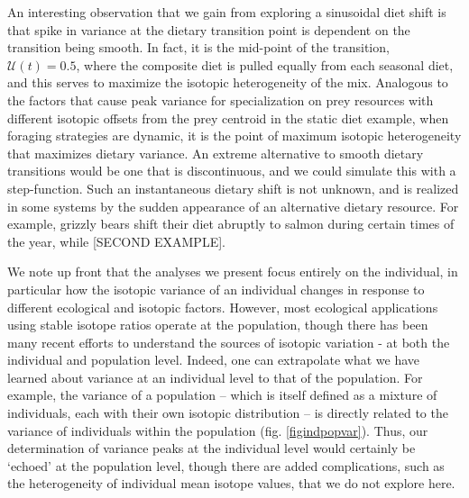 \documentclass{frontiersSCNS}
\begin{document}
An interesting observation that we gain from exploring a sinusoidal diet shift is that spike in variance at the dietary transition point is dependent on the transition being smooth.
In fact, it is the mid-point of the transition, $\mathcal{U}(t) = 0.5$, where the composite diet is pulled equally from each seasonal diet, and this serves to maximize the isotopic heterogeneity of the mix.
Analogous to the factors that cause peak variance for specialization on prey resources with different isotopic offsets from the prey centroid in the static diet example, when foraging strategies are dynamic, it is the point of maximum isotopic heterogeneity that maximizes dietary variance.
An extreme alternative to smooth dietary transitions would be one that is discontinuous, and we could simulate this with a step-function.
Such an instantaneous dietary shift is not unknown, and is realized in some systems by the sudden appearance of an alternative dietary resource.
For example, grizzly bears shift their diet abruptly to salmon during certain times of the year, while [SECOND EXAMPLE].




We note up front that the analyses we present focus entirely on the individual, in particular how the isotopic variance of an individual changes in response to different ecological and isotopic factors.
However, most ecological applications using stable isotope ratios operate at the population, though there has been many recent efforts to understand the sources of isotopic variation - at both the individual and population level.
Indeed, one can extrapolate what we have learned about variance at an individual level to that of the population.
For example, the variance of a population -- which is itself defined as a mixture of individuals, each with their own isotopic distribution -- is directly related to the variance of individuals within the population (fig. \ref{figindpopvar}).
Thus, our determination of variance peaks at the individual level would certainly be `echoed' at the population level, though there are added complications, such as the heterogeneity of individual mean isotope values, that we do not explore here.





\end{document}
